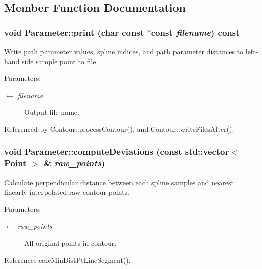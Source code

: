 \subsection{Member Function Documentation}
\hypertarget{classParameter_54d870873dcf44d515ab5384a38de7af}{
\subsubsection[print]{\setlength{\rightskip}{0pt plus 5cm}void Parameter::print (char const $\ast$const  {\em filename}) const}}
\label{classParameter_54d870873dcf44d515ab5384a38de7af}


Write path parameter values, spline indices, and path parameter distances to left-hand side sample point to file. \begin{Desc}
\item[Parameters:]
\begin{description}
\item[\mbox{$\leftarrow$} {\em filename}]Output file name. \end{description}
\end{Desc}


Referenced by Contour::processContour(), and Contour::writeFilesAfter().\hypertarget{classParameter_c3fd9360e62e3b9fe764a95e8f3e2b50}{
\subsubsection[computeDeviations]{\setlength{\rightskip}{0pt plus 5cm}void Parameter::computeDeviations (const std::vector$<$ {\bf Point} $>$ \& {\em raw\_\-points})}}
\label{classParameter_c3fd9360e62e3b9fe764a95e8f3e2b50}


Calculate perpendicular distance between each spline samples and nearest linearly-interpolated raw contour points. \begin{Desc}
\item[Parameters:]
\begin{description}
\item[\mbox{$\leftarrow$} {\em raw\_\-points}]All original points in contour. \end{description}
\end{Desc}


References calcMinDistPtLineSegment().

